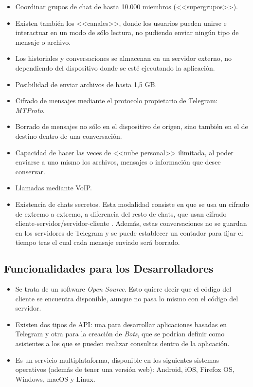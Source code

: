 \begin{itemize}
	\item Coordinar grupos de chat de hasta 10.000 miembros (<<supergrupos>>).
	\item Existen también los <<canales>>, donde los usuarios pueden unirse e interactuar en un modo de sólo lectura, no pudiendo enviar ningún tipo de mensaje o archivo.
	\item Los historiales y conversaciones se almacenan en un servidor externo, no dependiendo del dispositivo donde se esté ejecutando la aplicación.
	\item Posibilidad de enviar archivos de hasta 1,5 \acf{GB}.
	\item Cifrado de mensajes mediante el protocolo propietario de Telegram: \textit{MTProto}.
	\item Borrado de mensajes no sólo en el dispositivo de origen, sino también en el de destino dentro de una conversación.
	\item Capacidad de hacer las veces de <<nube personal>> ilimitada, al poder enviarse a uno mismo los archivos, mensajes o información que desee conservar.
	\item Llamadas mediante \acs{VoIP}.
	\item Existencia de chats secretos. Esta modalidad consiste en que se usa un cifrado de extremo a extremo, a diferencia del resto de chats, que usan cifrado cliente-servidor/servidor-cliente \cite{Telegram2017a}. Además, estas conversaciones no se guardan en los servidores de Telegram y se puede establecer un contador para fijar el tiempo tras el cual cada mensaje enviado será borrado.
\end{itemize}

\subsection{Funcionalidades para los Desarrolladores}

\begin{itemize}
	\item Se trata de un software \textit{Open Source}. Esto quiere decir que el código del cliente se encuentra disponible, aunque no pasa lo mismo con el código del servidor.
	\item Existen dos tipos de \acs{API}: una para desarrollar aplicaciones basadas en Telegram y otra para la creación de \textit{Bots}, que se podrían definir como asistentes a los que se pueden realizar consultas dentro de la aplicación.
	\item Es un servicio multiplataforma, disponible en los siguientes sistemas operativos (además de tener una versión web): Android, iOS, Firefox OS, Windows, macOS y Linux.
\end{itemize}

